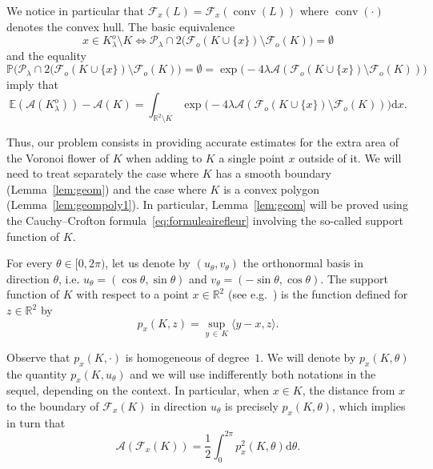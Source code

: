 \documentclass[10pt]{amsart}
\theoremstyle{definition}\newtheorem{defi}[theo]{Definition}\newtheorem{rema}[theo]{Remark}\newtheorem{exam}[theo]{Example}\newtheorem{exem}[theo]{Example}\newtheorem{nota}[theo]{Notation}
\DeclareMathOperator{\conv}{conv}
\newcommand{\cA}{\mathcal{A}}
\newcommand{\cF}{\mathcal{F}}
\newcommand{\cP}{\mathcal{P}}
\newcommand{\dd}{\mathrm{d}}
\newcommand{\E}{\mathbb{E}}
\renewcommand{\P}{\mathbb{P}}
\newcommand{\R}{\mathbb{R}}
\newcommand{\pass}{\vspace{0.3cm}\noindent}
\newcommand{\noi}{\noindent}
\begin{document}
We notice in particular that $\cF_x(L)=\cF_x(\conv(L))$ where $\conv(\cdot)$ denotes the convex hull. The basic equivalence
\begin{equation*}\label{eq:loipoissfleur}
x\in K_{\lambda}^o\setminus K \Longleftrightarrow \cP_{\lambda}\cap 2\big(\cF_o(K\cup \{x\})\setminus \cF_o(K)\big)=\emptyset
\end{equation*}
and the equality
\begin{equation}\label{eq:emptycap}
\P\big(\cP_{\lambda}\cap 2(\cF_o(K\cup \{x\})\setminus \cF_o(K)\big) = \emptyset = \exp\big(-4\lambda\cA(\cF_o(K \cup \{x\})\setminus\cF_o(K))\big)
\end{equation}
imply that
\begin{equation}\label{eq:airesmooth}
\E(\cA(K_{\lambda}^o))-\cA(K) = \int_{\R^2\setminus K} \exp\big(-4\lambda\cA(\cF_o(K \cup \{x\})\setminus\cF_o(K))\big)\dd x.
\end{equation}

Thus, our problem consists in providing accurate estimates for the extra area of the Voronoi flower of $K$ when adding to $K$ a single point $x$ outside of it. We will need to treat separately the case where $K$ has a smooth boundary (Lemma~\ref{lem:geom}) and the case where $K$ is a convex polygon (Lemma~\ref{lem:geompoly1}). In particular, Lemma~\ref{lem:geom} will be proved using the Cauchy--Crofton formula~\eqref{eq:formuleairefleur} involving the so-called support function of $K$.

For every $\theta\in [0,2\pi)$, let us denote by $(u_{\theta},v_{\theta})$ the orthonormal basis in direction $\theta$, i.e. $u_{\theta}=(\cos\theta,\sin\theta)$ and $v_{\theta}=(-\sin\theta,\cos\theta)$. The support function of $K$ with respect to a point $x\in\R^2$ (see e.g.~\cite[Section~1.7]{Schneider}) is the function defined for $z\in\R^2$ by
\begin{equation*}\label{def:suppfunc}
p_x(K,z) = \sup_{y\,\in\,K}\langle y-x,z\rangle.
\end{equation*}

Observe that $p_x(K,\cdot)$ is homogeneous of degree~$1$. We will denote by $p_x(K,\theta)$ the quantity $p_x(K,u_\theta)$ and we will use indifferently both notations in the sequel, depending on the context. In particular, when $x\in K$, the distance from $x$ to the boundary of $\cF_x(K)$ in direction $u_{\theta}$ is precisely $p_{x}(K,\theta)$, which implies in turn that
\begin{equation}\label{eq:formuleairefleur}
\cA(\cF_x(K))=\frac1{2}\int_0^{2\pi}p^2_x(K,\theta)\dd \theta.
\end{equation}
\end{document}
